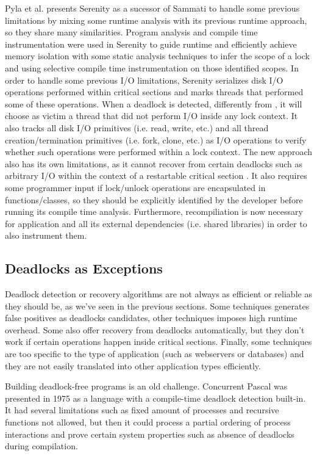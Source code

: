 Pyla et al. presents Serenity \cite{serenity} as a sucessor of Sammati \cite{sammati} to handle some previous limitations by mixing some runtime analysis with
its previous runtime approach, so they share many similarities.
Program analysis and compile time instrumentation were used in Serenity to guide runtime and efficiently achieve memory isolation with
some static analysis techniques to infer the scope of a lock and using selective compile time instrumentation on those identified scopes.
In order to handle some previous I/O limitations, Serenity serializes disk I/O operations performed within critical sections and marks
threads that performed some of these operations.
When a deadlock is detected, differently from \cite{sammati}, it will choose as victim a thread that did not perform I/O inside any lock context.
It also tracks all disk I/O primitives (i.e. read, write, etc.) and all thread creation/termination primitives (i.e. fork, clone,
etc.) as I/O operations to verify whether such operations were performed within a lock context.
The new approach also has its own limitations, as it cannot recover from certain deadlocks such as arbitrary I/O within the context of a restartable critical section \cite{pyla}.
It also requires some programmer input if lock/unlock operations are encapsulated in functions/classes,
so they should be explicitly identified by the developer before running its compile time analysis.
Furthermore, recompiliation is now necessary for application and all its external dependencies (i.e. shared libraries) in order to also instrument them.

\subsection{Deadlocks as Exceptions}

Deadlock detection or recovery algorithms are not always as efficient or reliable as they should be, as we've seen in the previous sections.
Some techniques generates false positives as deadlocks candidates, other techniques imposes high runtime overhead. Some also offer recovery from
deadlocks automatically, but they don't work if certain operations happen inside critical sections. Finally, some techniques are too specific
to the type of application (such as webservers or databases) and they are not easily translated into other application types efficiently.

Building deadlock-free programs is an old challenge.
Concurrent Pascal \cite{hansen} was presented in 1975 as a language with a compile-time deadlock detection built-in. It had several
limitations such as fixed amount of processes and recursive functions not allowed, but then it could process a partial ordering
of process interactions and prove certain system properties such as absence of deadlocks during compilation.

